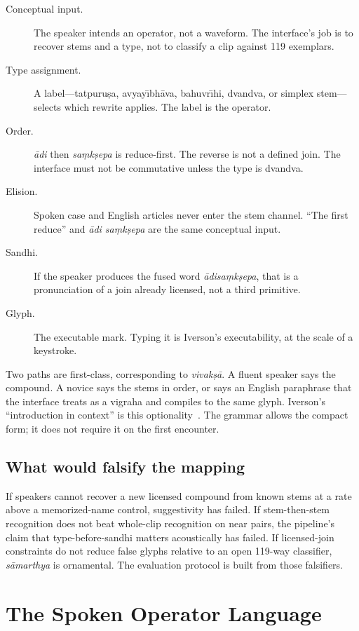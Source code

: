 \documentclass[manuscript, review, anonymous]{acmart}
\begin{document}
\begin{description}
\item[Conceptual input.] The speaker intends an operator, not a waveform. The interface's job is to recover stems and a type, not to classify a clip against 119 exemplars.
\item[Type assignment.] A label---tatpuru{\d{s}}a, avyay{\=\i}bh{\=a}va, bahuvr{\=\i}hi, dvandva, or simplex stem---selects which rewrite applies. The label is the operator.
\item[Order.] \textit{{\=a}di} then \textit{sa{\d{m}}k{\d{s}}epa} is reduce-first. The reverse is not a defined join. The interface must not be commutative unless the type is dvandva.
\item[Elision.] Spoken case and English articles never enter the stem channel. ``The first reduce'' and \textit{{\=a}di sa{\d{m}}k{\d{s}}epa} are the same conceptual input.
\item[Sandhi.] If the speaker produces the fused word \textit{{\=a}disa{\d{m}}k{\d{s}}epa}, that is a pronunciation of a join already licensed, not a third primitive.
\item[Glyph.] The executable mark. Typing it is Iverson's executability, at the scale of a keystroke.
\end{description}

Two paths are first-class, corresponding to \textit{vivak{\d{s}}{\=a}}. A fluent speaker says the compound. A novice says the stems in order, or says an English paraphrase that the interface treats as a vigraha and compiles to the same glyph. Iverson's ``introduction in context'' is this optionality~\cite{Iverson1980Notation}. The grammar allows the compact form; it does not require it on the first encounter.

\subsection{What would falsify the mapping}

If speakers cannot recover a new licensed compound from known stems at a rate above a memorized-name control, suggestivity has failed. If stem-then-stem recognition does not beat whole-clip recognition on near pairs, the pipeline's claim that type-before-sandhi matters acoustically has failed. If licensed-join constraints do not reduce false glyphs relative to an open 119-way classifier, \textit{s{\=a}marthya} is ornamental. The evaluation protocol is built from those falsifiers.

\section{The Spoken Operator Language}
\label{sec:language}
\end{document}
